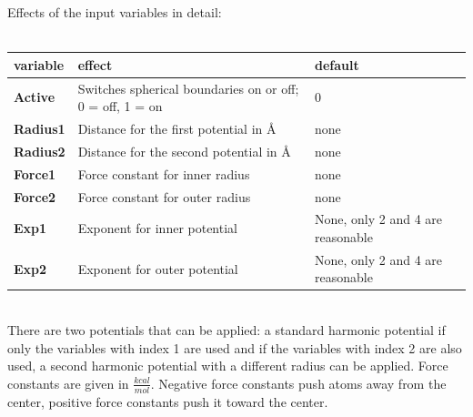 \documentclass[10pt,a4paper]{article} %
\begin{document}
	Effects of the input variables in detail:\\~\\
	\begin{tabularx}{\textwidth}{l|X|X}
		\textbf{variable} & effect & default \\
		\hline
		\textbf{Active} & Switches spherical boundaries on or off; 0 = off, 1 = on & 0 \\
		\textbf{Radius1} & Distance for the first potential in \AA & none \\
		\textbf{Radius2} & Distance for the second potential in \AA & none \\
		\textbf{Force1} & Force constant for inner radius & none \\
		\textbf{Force2} & Force constant for outer radius & none \\
		\textbf{Exp1} & Exponent for inner potential & None, only 2 and 4 are reasonable \\
		\textbf{Exp2} & Exponent for outer potential & None, only 2 and 4 are reasonable \\
	\end{tabularx}~\\
	There are two potentials that can be applied: a standard harmonic potential if only the variables with index 1 are used and if the variables with index 2 are also used, a second harmonic potential with a different radius can be applied.
	Force constants are given in $\frac{kcal}{mol}$. Negative force constants push atoms away from the center, positive force constants push it toward the center.
\end{document}
